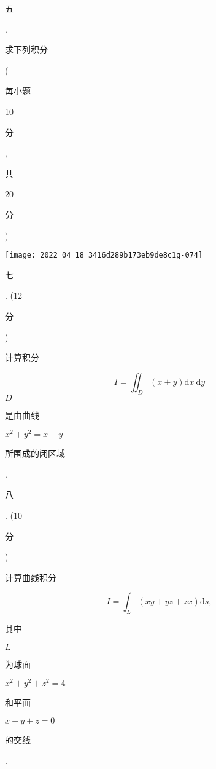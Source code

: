 \documentclass[10pt]{article}
\begin{document}
\begin{CJK}{UTF8}{mj}五\end{CJK}. \begin{CJK}{UTF8}{mj}求下列积分\end{CJK} (\begin{CJK}{UTF8}{mj}每小题\end{CJK} 10 \begin{CJK}{UTF8}{mj}分\end{CJK}, \begin{CJK}{UTF8}{mj}共\end{CJK} 20 \begin{CJK}{UTF8}{mj}分\end{CJK})

\texttt{[image: 2022\_04\_18\_3416d289b173eb9de8c1g-074]}

\begin{CJK}{UTF8}{mj}七\end{CJK}. (12 \begin{CJK}{UTF8}{mj}分\end{CJK}) \begin{CJK}{UTF8}{mj}计算积分\end{CJK}
$$
I=\iint_{D}(x+y) \mathrm{d} x \mathrm{~d} y
$$
$D$ \begin{CJK}{UTF8}{mj}是由曲线\end{CJK} $x^{2}+y^{2}=x+y$ \begin{CJK}{UTF8}{mj}所围成的闭区域\end{CJK}.

\begin{CJK}{UTF8}{mj}八\end{CJK}. (10 \begin{CJK}{UTF8}{mj}分\end{CJK}) \begin{CJK}{UTF8}{mj}计算曲线积分\end{CJK}
$$
I=\int_{L}(x y+y z+z x) \mathrm{d} s,
$$
\begin{CJK}{UTF8}{mj}其中\end{CJK} $L$ \begin{CJK}{UTF8}{mj}为球面\end{CJK} $x^{2}+y^{2}+z^{2}=4$ \begin{CJK}{UTF8}{mj}和平面\end{CJK} $x+y+z=0$ \begin{CJK}{UTF8}{mj}的交线\end{CJK}.
\end{document}
